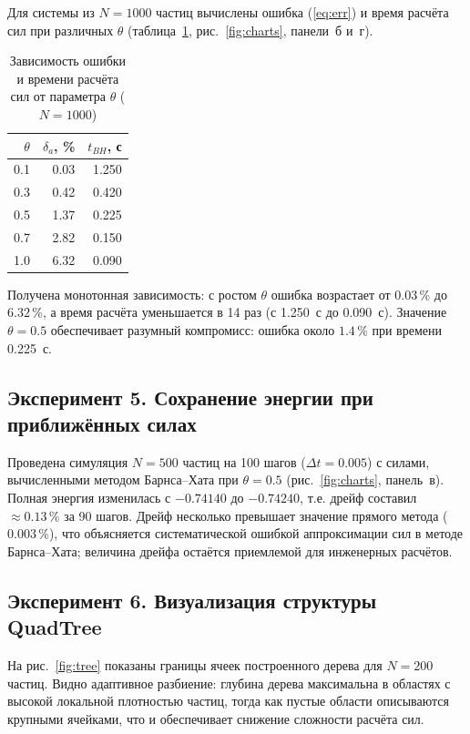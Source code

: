\documentclass[12pt,a4paper]{article}
\begin{document}
	Для системы из $N = 1000$ частиц вычислены ошибка (\ref{eq:err}) и время расчёта сил при различных $\theta$ (таблица~\ref{tab:theta}, рис.~\ref{fig:charts}, панели~б и~г).
	
	\begin{table}[h]
		\centering
		\caption{Зависимость ошибки и времени расчёта сил от параметра $\theta$ ($N = 1000$)}
		\label{tab:theta}
		\begin{tabular}{rrr}
			\toprule
			$\theta$ & $\delta_a$, \% & $t_{BH}$, с \\
			\midrule
			0.1 & 0.03 & 1.250 \\
			0.3 & 0.42 & 0.420 \\
			0.5 & 1.37 & 0.225 \\
			0.7 & 2.82 & 0.150 \\
			1.0 & 6.32 & 0.090 \\
			\bottomrule
		\end{tabular}
	\end{table}
	
	Получена монотонная зависимость: с ростом $\theta$ ошибка возрастает от $0.03\,\%$ до $6.32\,\%$, а время расчёта уменьшается в 14 раз (с 1.250~с до 0.090~с). Значение $\theta = 0.5$ обеспечивает разумный компромисс: ошибка около $1.4\,\%$ при времени 0.225~с.
	
	\subsection{Эксперимент 5. Сохранение энергии при приближённых силах}
	
	Проведена симуляция $N = 500$ частиц на 100 шагов ($\Delta t = 0.005$) с силами, вычисленными методом Барнса--Хата при $\theta = 0.5$ (рис.~\ref{fig:charts}, панель~в). Полная энергия изменилась с $-0.74140$ до $-0.74240$, т.е. дрейф составил $\approx 0.13\,\%$ за 90 шагов. Дрейф несколько превышает значение прямого метода ($0.003\,\%$), что объясняется систематической ошибкой аппроксимации сил в методе Барнса--Хата; величина дрейфа остаётся приемлемой для инженерных расчётов.
	
	\subsection{Эксперимент 6. Визуализация структуры QuadTree}
	
	На рис.~\ref{fig:tree} показаны границы ячеек построенного дерева для $N = 200$ частиц. Видно адаптивное разбиение: глубина дерева максимальна в областях с высокой локальной плотностью частиц, тогда как пустые области описываются крупными ячейками, что и обеспечивает снижение сложности расчёта сил.
	
\end{document}
